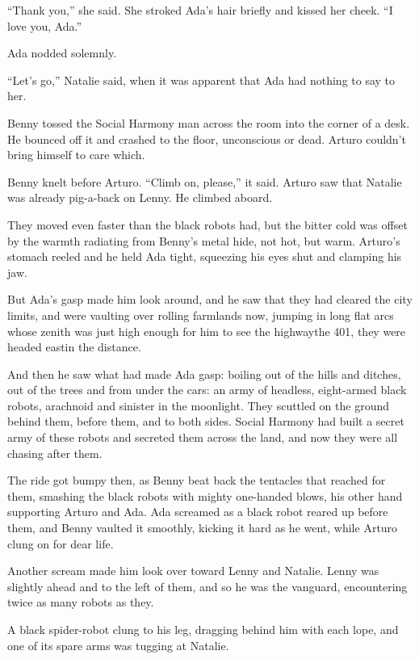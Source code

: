 “Thank you,” she said. She stroked Ada’s hair briefly and kissed
her cheek. “I love you, Ada.”

Ada nodded solemnly.

“Let’s go,” Natalie said, when it was apparent that Ada had nothing
to say to her.

Benny tossed the Social Harmony man across the room into the corner
of a desk. He bounced off it and crashed to the floor, unconscious
or dead. Arturo couldn’t bring himself to care which.

Benny knelt before Arturo. “Climb on, please,” it said. Arturo saw
that Natalie was already pig-a-back on Lenny. He climbed aboard.

\tb

They moved even faster than the black robots had, but the bitter
cold was offset by the warmth radiating from Benny’s metal hide,
not hot, but warm. Arturo’s stomach reeled and he held Ada tight,
squeezing his eyes shut and clamping his jaw.

But Ada’s gasp made him look around, and he saw that they had
cleared the city limits, and were vaulting over rolling farmlands
now, jumping in long flat arcs whose zenith was just high enough
for him to see the highway{\dash}the 401, they were headed east{\dash}in the
distance.

And then he saw what had made Ada gasp: boiling out of the hills
and ditches, out of the trees and from under the cars: an army of
headless, eight-armed black robots, arachnoid and sinister in the
moonlight. They scuttled on the ground behind them, before them,
and to both sides. Social Harmony had built a secret army of these
robots and secreted them across the land, and now they were all
chasing after them.

\tb

The ride got bumpy then, as Benny beat back the tentacles that
reached for them, smashing the black robots with mighty one-handed
blows, his other hand supporting Arturo and Ada. Ada screamed as a
black robot reared up before them, and Benny vaulted it smoothly,
kicking it hard as he went, while Arturo clung on for dear life.

Another scream made him look over toward Lenny and Natalie. Lenny
was slightly ahead and to the left of them, and so he was the
vanguard, encountering twice as many robots as they.

A black spider-robot clung to his leg, dragging behind him with
each lope, and one of its spare arms was tugging at Natalie.

